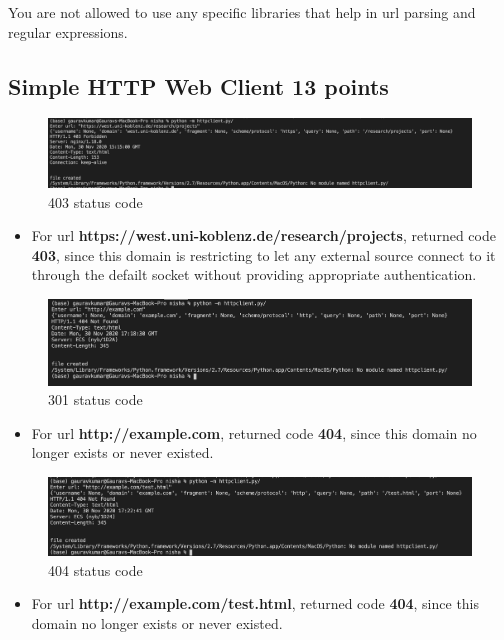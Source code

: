 \documentclass{resources/WeSTassignment}
\begin{document}
\begin{enumerate}
\begin{enumerate}
\end{enumerate}

You are not allowed to use any specific libraries that help in url parsing and regular expressions. 

\subsection{Simple HTTP Web Client \hfill{13 points}}
\begin{figure}[h!]
  \includegraphics[width=\linewidth]{resources/403.png}
  \caption{403 status code}
  \label{403 status code}
\end{figure}
\begin{itemize}

\item For url \textbf{https://west.uni-koblenz.de/research/projects}, returned code \textbf{403}, since this domain is restricting to let any external source connect to it through the defailt socket without providing appropriate authentication.

\end{itemize}
\begin{figure}[h!]
  \includegraphics[width=\linewidth]{resources/404_a.png}
  \caption{301 status code}
  \label{301 status code}
\end{figure}
\begin{itemize}

\item For url \textbf{http://example.com}, returned code \textbf{404}, since this domain no longer exists or never existed.

\end{itemize}
\begin{figure}[h!]
  \includegraphics[width=\linewidth]{resources/404_b.png}
  \caption{404 status code}
  \label{404 status code}
\end{figure}
\begin{itemize}

\item For url \textbf{http://example.com/test.html}, returned code \textbf{404}, since this domain no longer exists or never existed.

\end{itemize}
    
\end{document}
